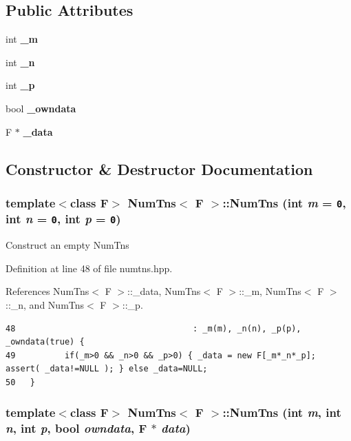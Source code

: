 \subsection*{Public Attributes}
\begin{CompactItemize}
\item 
int {\bf \_\-m}
\item 
int {\bf \_\-n}
\item 
int {\bf \_\-p}
\item 
bool {\bf \_\-owndata}
\item 
F $\ast$ {\bf \_\-data}
\end{CompactItemize}


\subsection{Constructor \& Destructor Documentation}
\subsubsection{\setlength{\rightskip}{0pt plus 5cm}template$<$class F$>$ {\bf Num\-Tns}$<$ F $>$::{\bf Num\-Tns} (int {\em m} = {\tt 0}, int {\em n} = {\tt 0}, int {\em p} = {\tt 0})\hspace{0.3cm}{\tt  [inline]}}\label{classNumTns_2518cf504174f92a57376bb53a94accd_2518cf504174f92a57376bb53a94accd}


Construct an empty Num\-Tns 

Definition at line 48 of file numtns.hpp.

References Num\-Tns$<$ F $>$::\_\-data, Num\-Tns$<$ F $>$::\_\-m, Num\-Tns$<$ F $>$::\_\-n, and Num\-Tns$<$ F $>$::\_\-p.

\footnotesize\begin{verbatim}48                                    : _m(m), _n(n), _p(p), _owndata(true) {
49          if(_m>0 && _n>0 && _p>0) { _data = new F[_m*_n*_p]; assert( _data!=NULL ); } else _data=NULL;
50   }
\end{verbatim}\normalsize 


\subsubsection{\setlength{\rightskip}{0pt plus 5cm}template$<$class F$>$ {\bf Num\-Tns}$<$ F $>$::{\bf Num\-Tns} (int {\em m}, int {\em n}, int {\em p}, bool {\em owndata}, F $\ast$ {\em data})\hspace{0.3cm}{\tt  [inline]}}\label{classNumTns_86b51ac3e41b80b46b56feb306842d0c_86b51ac3e41b80b46b56feb306842d0c}




